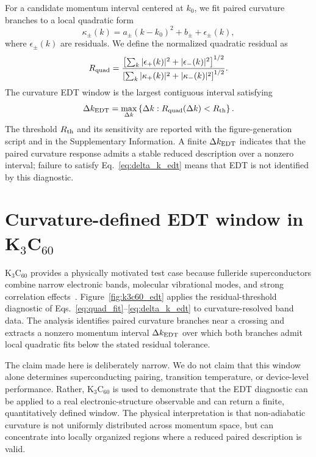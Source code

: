 \documentclass[
  prx,
  reprint,
  superscriptaddress,
  amsmath,
  amssymb,
  aps
]{revtex4-2}
\begin{document}
For a candidate momentum interval centered at $k_0$, we fit paired curvature branches to a local quadratic form
\begin{equation}
\kappa_\pm(k)=a_\pm(k-k_0)^2+b_\pm+\epsilon_\pm(k),
\label{eq:quad_fit}
\end{equation}
where $\epsilon_\pm(k)$ are residuals. We define the normalized quadratic residual as
\begin{equation}
R_{\rm quad}
=
\frac{
\left[\sum_k |\epsilon_+(k)|^2+|\epsilon_-(k)|^2\right]^{1/2}
}{
\left[\sum_k |\kappa_+(k)|^2+|\kappa_-(k)|^2\right]^{1/2}
}.
\label{eq:rquad}
\end{equation}
The curvature EDT window is the largest contiguous interval satisfying
\begin{equation}
\Delta k_{\rm EDT}
=
\max_{\Delta k}\left\{\Delta k:R_{\rm quad}(\Delta k)<R_{\rm th}\right\}.
\label{eq:delta_k_edt}
\end{equation}
The threshold $R_{\rm th}$ and its sensitivity are reported with the figure-generation script and in the Supplementary Information. A finite $\Delta k_{\rm EDT}$ indicates that the paired curvature response admits a stable reduced description over a nonzero interval; failure to satisfy Eq.~\eqref{eq:delta_k_edt} means that EDT is not identified by this diagnostic.

\section{Curvature-defined EDT window in K$_3$C$_{60}$}

K$_3$C$_{60}$ provides a physically motivated test case because fulleride superconductors combine narrow electronic bands, molecular vibrational modes, and strong correlation effects~\cite{Gunnarsson1997,Capone2009}. Figure~\ref{fig:k3c60_edt} applies the residual-threshold diagnostic of Eqs.~\eqref{eq:quad_fit}--\eqref{eq:delta_k_edt} to curvature-resolved band data. The analysis identifies paired curvature branches near a crossing and extracts a nonzero momentum interval $\Delta k_{\rm EDT}$ over which both branches admit local quadratic fits below the stated residual tolerance.

The claim made here is deliberately narrow. We do not claim that this window alone determines superconducting pairing, transition temperature, or device-level performance. Rather, K$_3$C$_{60}$ is used to demonstrate that the EDT diagnostic can be applied to a real electronic-structure observable and can return a finite, quantitatively defined window. The physical interpretation is that non-adiabatic curvature is not uniformly distributed across momentum space, but can concentrate into locally organized regions where a reduced paired description is valid.
\end{document}
